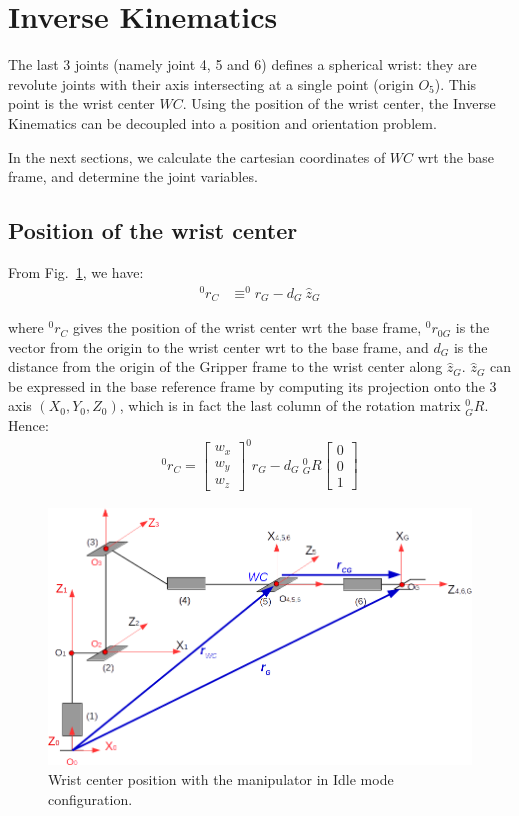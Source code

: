 \documentclass[a4paper,12pt]{report}
\begin{document}
\section{Inverse Kinematics}
The last 3 joints (namely joint 4, 5 and 6) defines a spherical wrist: they are revolute joints with their axis intersecting at a single point (origin $O_5$). This point is the wrist center $WC$. Using the position of the wrist center, the Inverse Kinematics can be decoupled into a position and orientation problem.

In the next sections, we calculate the cartesian coordinates of $WC$ wrt the base frame, and determine the joint variables.

\subsection{Position of the wrist center}
From Fig.~\ref{fig:fig_wc}, we have:
\begin{align}
^0 r_{C} & \equiv ^0 r_G - d_G \ \hat{z}_G 
\end{align}

where $^0 r_C$ gives the position of the wrist center wrt the base frame, $^0 r_{0G}$ is the vector from the origin to the wrist center wrt to the base frame, and $d_G$ is the distance from the origin of the Gripper frame to the wrist center along $\hat{z}_G$. $\hat{z}_G$ can be expressed in the base reference frame by computing its projection onto the 3 axis $(X_0, Y_0, Z_0)$, which is in fact the last column of the rotation matrix $_G ^0 R$. Hence:
\begin{align}
^0 r_{C} = \left[ \begin{matrix} w_x \\ w_y \\ w_z \end{matrix} \right] ^0 r_G - d_G \ _G ^0 R \left[\begin{matrix} 0 \\ 0 \\ 1 \end{matrix} \right] 
\end{align}


\begin{figure}[H]
\centering
        \includegraphics[totalheight=12cm]{imgs/wrist_center.png}
        \caption{Wrist center position with the manipulator in Idle mode configuration.}
        \label{fig:fig_wc}
\end{figure}
\end{document}
